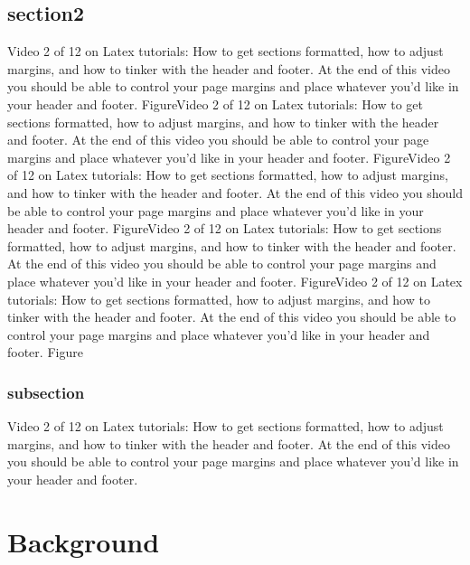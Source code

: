 \documentclass[12pt]{report}
\begin{document}
\section{section2}
Video 2 of 12 on Latex tutorials: How to get sections formatted, how to adjust margins, and how to tinker with the header and footer. At the end of this video you should be able to control your page margins and place whatever you'd like in your header and footer. FigureVideo 2 of 12 on Latex tutorials: How to get sections formatted, how to adjust margins, and how to tinker with the header and footer. At the end of this video you should be able to control your page margins and place whatever you'd like in your header and footer. FigureVideo 2 of 12 on Latex tutorials: How to get sections formatted, how to adjust margins, and how to tinker with the header and footer. At the end of this video you should be able to control your page margins and place whatever you'd like in your header and footer. FigureVideo 2 of 12 on Latex tutorials: How to get sections formatted, how to adjust margins, and how to tinker with the header and footer. At the end of this video you should be able to control your page margins and place whatever you'd like in your header and footer. FigureVideo 2 of 12 on Latex tutorials: How to get sections formatted, how to adjust margins, and how to tinker with the header and footer. At the end of this video you should be able to control your page margins and place whatever you'd like in your header and footer. Figure

\subsection*{subsection}
Video 2 of 12 on Latex tutorials: How to get sections formatted, how to adjust margins, and how to tinker with the header and footer. At the end of this video you should be able to control your page margins and place whatever you'd like in your header and footer.



\chapter{Background}
\end{document}
